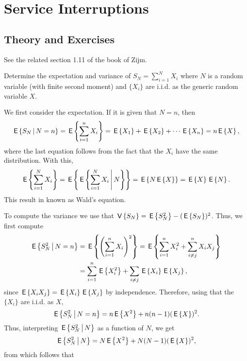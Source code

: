 \section{Service Interruptions}
\label{sec:serv-interr}


\subsection*{Theory and Exercises}



See the related section 1.11 of the book of Zijm.

\begin{exercise}
  Determine the expectation and variance of $S_N = \sum_{i=1}^N X_i$
  where $N$ is a random variable (with finite second moment) and
  $\{X_i\}$ are i.i.d. as the generic random variable $X$.
\begin{solution}
We first consider the
expectation.  If it is given that $N=n$, then
\begin{equation*}
  \,\mathsf{E}\left\{S_N \,\middle|\, N=n\right\} =  \,\mathsf{E}\left\{\sum_{i=1}^n X_i\right\}= \,\mathsf{E}\left\{X_1\right\} + \,\mathsf{E}\left\{X_2\right\} + \cdots \,\mathsf{E}\left\{X_n\right\} = n \,\mathsf{E}\left\{X\right\},
\end{equation*}
where the last equation follows from the fact that the $X_i$ have the same distribution. With this, 
\begin{equation*}
  \,\mathsf{E}\left\{\sum_{i=1}^N X_i\right\} =   \,\mathsf{E}\left\{\,\mathsf{E}\left\{\sum_{i=1}^N X_i \,\middle|\, N\right\}\right\} =  \,\mathsf{E}\left\{N\,\mathsf{E}\left\{X\right\}\right\} = \,\mathsf{E}\left\{X\right\} \,\mathsf{E}\left\{N\right\}.
\end{equation*}
This result in known as Wald's equation. 

To compute the variance we use that $\,\mathsf{V}\left\{S_N\right\} =\,\mathsf{E}\left\{S_N^2\right\} - (\,\mathsf{E}\left\{S_N\right\})^2$. Thus, we first compute
\begin{equation*}
  \begin{split}
  \,\mathsf{E}\left\{ S_N^2 \,\middle|\,  N=n\right\} 
&=  \,\mathsf{E}\left\{\left(\sum_{i=1}^n X_i\right)^2\right\}  
=  \,\mathsf{E}\left\{\sum_{i=1}^n X_i^2 + \sum_{i\neq j}^n X_i X_j\right\}  \\
&= \sum_{i=1}^n \,\mathsf{E}\left\{X^2_i\right\} + \sum_{i \neq j} \,\mathsf{E}\left\{X_i\right\} \,\mathsf{E}\left\{X_j\right\},
  \end{split}
\end{equation*}
since $\,\mathsf{E}\left\{X_iX_j\right\} = \,\mathsf{E}\left\{X_i\right\} \,\mathsf{E}\left\{X_j\right\}$ by independence. Therefore, using
that the $\{X_i\}$ are i.i.d. as $X$,
\begin{equation*}
  \,\mathsf{E}\left\{ S_N^2 \,\middle|\, N=n\right\} = n \,\mathsf{E}\left\{X^2\right\} + n(n-1) (\,\mathsf{E}\left\{X\right\})^2. 
\end{equation*}
Thus, interpreting $\,\mathsf{E}\left\{S_N^2\,\middle|\, N\right\}$ as a function of $N$, we get
\begin{equation*}
  \,\mathsf{E}\left\{ S_N^2 \,\middle|\, N\right\} = N \,\mathsf{E}\left\{X^2\right\} + N(N-1) (\,\mathsf{E}\left\{X\right\})^2,
\end{equation*}
from which follows that


\end{solution}
\end{exercise}
